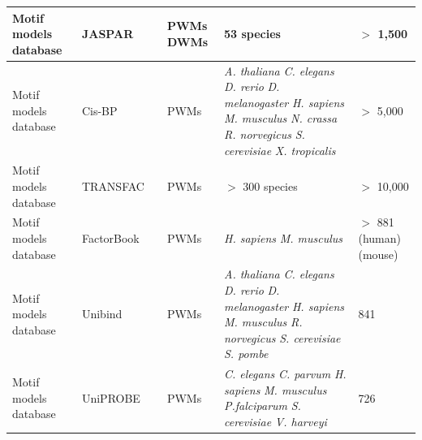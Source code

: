\documentclass[a4paper, titlepage, openright]{book}
\begin{document}
\begin{longtable}{|p{2cm}|p{2cm}|p{3cm}|p{2cm}|p{4cm}|p{2cm}|}
		\hline
		Motif models database & JASPAR & \citep{sandelin2004jaspar, fornes2020jaspar} & PWMs \newline DWMs & 53 species & $>$ 1,500 \\
		\hline
		Motif models database & Cis-BP & \citep{weirauch2014determination} & PWMs & \emph{A. thaliana} \newline \emph{C. elegans} \newline \emph{D. rerio}  \newline \emph{D. melanogaster} \newline \emph{H. sapiens} \newline \emph{M. musculus} \newline \emph{N. crassa} \newline \emph{R. norvegicus} \newline \emph{S. cerevisiae} \newline \emph{X. tropicalis} & $>$ 5,000 \\
		\hline
		Motif models database & TRANSFAC & \citep{wingender1996transfac, wingender2000transfac} & PWMs & $>$ 300 species & $>$ 10,000 \\
		\hline
		Motif models database & FactorBook & \citep{pratt2022factorbook} & PWMs & \emph{H. sapiens} \newline \emph{M. musculus}  & $>$ 881 (human) \newline 49 (mouse) \\
		\hline
		Motif models database & Unibind & \citep{puig2021unibind} & PWMs &\emph{A. thaliana} \newline \emph{C. elegans} \newline \emph{D. rerio}  \newline \emph{D. melanogaster} \newline \emph{H. sapiens} \newline \emph{M. musculus} \newline \emph{R. norvegicus} \newline \emph{S. cerevisiae} \newline \emph{S. pombe}  & 841 \\
		\hline
		Motif models database & UniPROBE & \citep{newburger2009uniprobe} & PWMs & \emph{C. elegans} \newline \emph{C. parvum} \newline \emph{H. sapiens} \newline \emph{M. musculus} \newline \emph{P.falciparum} \newline \emph{S. cerevisiae} \newline \emph{V. harveyi}  & 726 \\

\end{longtable}
\end{document}

